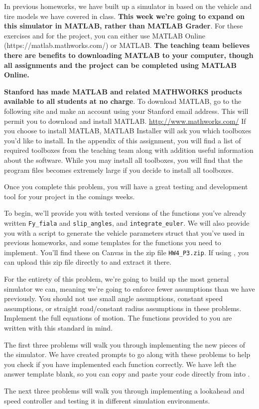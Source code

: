 In previous homeworks, we have built up a simulator in \GRno{} based on the vehicle and tire models we have covered in
class. \textbf{This week we're going to expand on this simulator in MATLAB, rather than MATLAB Grader}. For these exercises and for the project, you can either use MATLAB Online (https://matlab.mathworks.com/) or MATLAB.  \textbf{The teaching team believes there are benefits to downloading MATLAB to your computer, though all assignments and the project can be completed using MATLAB Online.}  

\textbf{Stanford has made MATLAB and related MATHWORKS products available to all students at no charge}. To download MATLAB, go to the following site and make an account using your Stanford email address.  This will permit you to download and install MATLAB.
\center
\url{http://www.mathworks.com/}
\flushleft
If you choose to install MATLAB, MATLAB Installer will ask you which toolboxes you'd like to install.  In the appendix of this assignment, you will find a list of required toolboxes from the teaching team along with addition useful information about the software.  While you may install all toolboxes, you will find that the program files becomes extremely large if you decide to install all toolboxes.

Once you complete this
problem, you will have a great testing and development tool for your project in the comings weeks.

To begin, we'll provide you with tested versions of the functions you've already written \verb!Fy_fiala! and
\verb!slip_angles!, and \verb!integrate_euler!. We will also provide you with a script to generate the vehicle
parameters struct that you've used in previous homeworks, and some templates for the functions you need to implement.
You'll find these on Canvas in the zip file \verb!HW4_P3.zip!. If using \MOno{}, you can upload this zip file directly to \MOno{} and
extract it there.

For the entirety of this problem, we're going to build up the most general simulator we can, meaning we're going to
enforce fewer assumptions than we have previously. You should not use small angle assumptions, constant speed
assumptions, or straight road/constant radius assumptions in these problems. Implement the full equations of motion.
The functions provided to you are written with this standard in mind.

The first three problems will walk you through implementing the new pieces of the simulator. We have created \GRno{}
prompts to
go along with these problems to help you check if you have implemented each function correctly. We have left the answer
template blank, so you can copy and paste your code directly from \MOno{} into \GRno{}.

The next three problems will walk you through implementing a lookahead and speed controller and testing it in different
simulation environments.

\vspace*{1cm}
